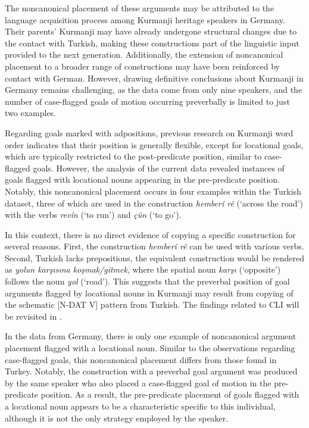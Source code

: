 The noncanonical placement of these arguments may be attributed to the language acquisition process among Kurmanji heritage speakers in Germany. Their parents’ Kurmanji may have already undergone structural changes due to the contact with Turkish, making these constructions part of the linguistic input provided to the next generation. Additionally, the extension of noncanonical placement to a broader range of constructions may have been reinforced by contact with German. However, drawing definitive conclusions about Kurmanji in Germany remains challenging, as the data come from only nine speakers, and the number of case-flagged goals of motion occurring preverbally is limited to just two examples.

Regarding goals marked with adpositions, previous research on Kurmanji word order indicates that their position is generally flexible, except for locational goals, which are typically restricted to the post-predicate position, similar to case-flagged goals. However, the analysis of the current data revealed instances of goals flagged with locational nouns appearing in the pre-predicate position. Notably, this noncanonical placement occurs in four examples within the Turkish dataset, three of which are used in the construction \textit{hemberî rê} (‘across the road’) with the verbs \textit{revîn} (‘to run’) and \textit{çûn} (‘to go’).

In this context, there is no direct evidence of copying a specific construction for several reasons. First, the construction \textit{hemberî rê} can be used with various verbs. Second, Turkish lacks prepositions, the equivalent construction would be rendered as \textit{yolun karşısına koşmak/gitmek}, where the spatial noun \textit{karşı} (‘opposite’) follows the noun \textit{yol} (‘road’). This suggests that the preverbal position of goal arguments flagged by locational nouns in Kurmanji may result from copying of the schematic [N-DAT V] pattern from Turkish. The findings related to CLI will be revisited in .

In the data from Germany, there is only one example of noncanonical argument placement flagged with a locational noun. Similar to the observations regarding case-flagged goals, this noncanonical placement differs from those found in Turkey. Notably, the construction with a preverbal goal argument was produced by the same speaker who also placed a case-flagged goal of motion in the pre-predicate position. As a result, the pre-predicate placement of goals flagged with a locational noun appears to be a characteristic specific to this individual, although it is not the only strategy employed by the speaker.

